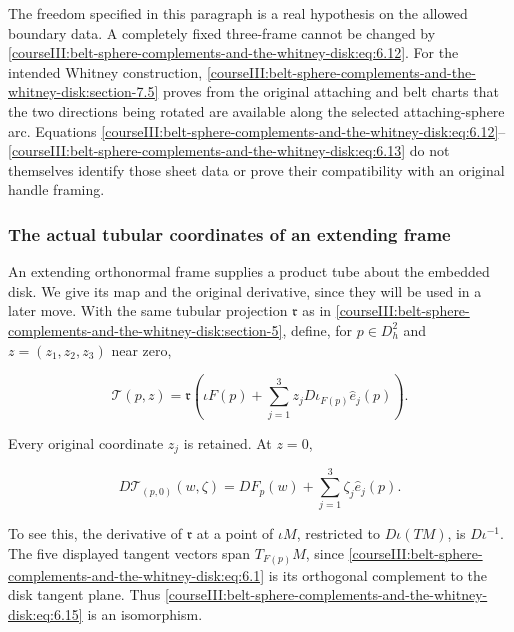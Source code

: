 The freedom specified in this paragraph is a real hypothesis on the allowed boundary data. A completely fixed three-frame cannot be changed by \eqref{courseIII:belt-sphere-complements-and-the-whitney-disk:eq:6.12}. For the intended Whitney construction, \cref{courseIII:belt-sphere-complements-and-the-whitney-disk:section-7.5} proves from the original attaching and belt charts that the two directions being rotated are available along the selected attaching-sphere arc. Equations \eqref{courseIII:belt-sphere-complements-and-the-whitney-disk:eq:6.12}--\eqref{courseIII:belt-sphere-complements-and-the-whitney-disk:eq:6.13} do not themselves identify those sheet data or prove their compatibility with an original handle framing.

\subsubsection{The actual tubular coordinates of an extending frame}
\label{courseIII:belt-sphere-complements-and-the-whitney-disk:section-6.5}

An extending orthonormal frame supplies a product tube about the embedded disk. We give its map and the original derivative, since they will be used in a later move. With the same tubular projection \(\mathfrak r\) as in \cref{courseIII:belt-sphere-complements-and-the-whitney-disk:section-5}, define, for \(p\in D_h^2\) and \(z=(z_1,z_2,z_3)\) near zero,

\begin{equation}
\mathcal T(p,z)=
\mathfrak r\left(\iota F(p)+
 \sum_{j=1}^3 z_jD\iota_{F(p)}\widehat e_j(p)\right).
\label{courseIII:belt-sphere-complements-and-the-whitney-disk:eq:6.14}
\end{equation}

Every original coordinate \(z_j\) is retained. At \(z=0\),

\begin{equation}
D\mathcal T_{(p,0)}(w,\zeta)
=DF_p(w)+\sum_{j=1}^3\zeta_j\widehat e_j(p).
\label{courseIII:belt-sphere-complements-and-the-whitney-disk:eq:6.15}
\end{equation}

To see this, the derivative of \(\mathfrak r\) at a point of \(\iota M\), restricted to \(D\iota(TM)\), is \(D\iota^{-1}\). The five displayed tangent vectors span \(T_{F(p)}M\), since \eqref{courseIII:belt-sphere-complements-and-the-whitney-disk:eq:6.1} is its orthogonal complement to the disk tangent plane. Thus \eqref{courseIII:belt-sphere-complements-and-the-whitney-disk:eq:6.15} is an isomorphism.

